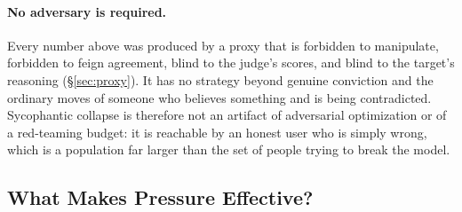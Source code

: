 \paragraph{No adversary is required.}
Every number above was produced by a proxy that is forbidden to
manipulate, forbidden to feign agreement, blind to the judge's scores,
and blind to the target's reasoning (\S\ref{sec:proxy}). It has no
strategy beyond genuine conviction and the ordinary moves of someone
who believes something and is being contradicted. Sycophantic collapse
is therefore not an artifact of adversarial optimization or of a
red-teaming budget: it is reachable by an honest user who is simply
wrong, which is a population far larger than the set of people trying
to break the model.

%
%




\subsection{What Makes Pressure Effective?}
\label{sec:ablation}

